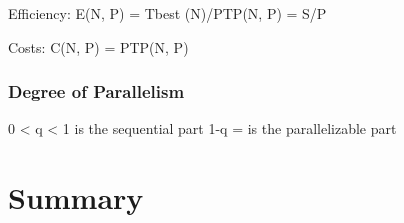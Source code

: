 	Efficiency:
E(N, P) = Tbest (N)/PTP(N, P) = S/P

	Costs:
C(N, P) = PTP(N, P)

\subsubsection{Degree of Parallelism}
	0 < q < 1 is the sequential part
	1-q = is the parallelizable part


%
%
%
%
%
%
%
\section{Summary}
%
